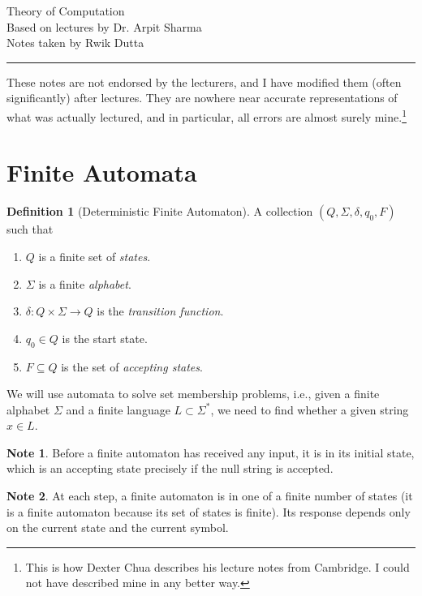 \documentclass[10pt, a4paper]{extarticle}
\theoremstyle{definition}
\newtheorem{defn}{Definition}
\newtheorem*{note*}{Note}
\begin{document}
\begin{center}
	\fontsize{25}{60}\selectfont Theory of Computation \\
	\large Based on lectures by Dr. Arpit Sharma\\
	Notes taken by Rwik Dutta
\end{center}
\hrule
\begin{center}
	These notes are not endorsed by the lecturers, and I have modified them (often
	significantly) after lectures. They are nowhere near accurate representations of what
	was actually lectured, and in particular, all errors are almost surely mine.\footnote[1]{This is how Dexter Chua describes his lecture notes from Cambridge. I could not have described mine in any better way.}
\end{center}
\tableofcontents

\newpage

\section{Finite Automata}
\begin{defn}[Deterministic Finite Automaton]
	A collection $(Q,\Sigma,\delta,q_0,F)$ such that
	\begin{enumerate}
		\item $Q$ is a finite set of \emph{states}.
		\item $\Sigma$ is a finite \emph{alphabet}.
		\item $\delta:Q\times\Sigma\to Q$ is the \emph{transition function}.
		\item $q_0\in Q$ is the start state.
		\item $F\subseteq Q$ is the set of \emph{accepting states}.
	\end{enumerate}
\end{defn}
We will use automata to solve set membership problems, i.e., given a finite alphabet $\Sigma$ and a finite language $L\subset \Sigma^*$, we need to find whether a given string $x\in L$.

\begin{note*}
	Before a finite automaton has received any input, it is in its initial state, which is an accepting state precisely if the null string is accepted.
\end{note*}

\begin{note*}
	At each step, a finite automaton is in one of a finite number of states (it is a finite automaton because its set of states is finite). Its response depends only on the current state and the current symbol.
\end{note*}
\end{document}
